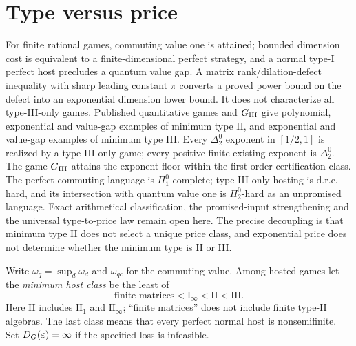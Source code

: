 \section{Type versus price}\label{sec:phase}
For finite rational games, commuting value one is attained; bounded dimension cost is equivalent to a finite-dimensional perfect strategy, and a normal type-I perfect host precludes a quantum value gap. A matrix rank/dilation-defect inequality with sharp leading constant $\pi$ converts a proved power bound on the defect into an exponential dimension lower bound. It does not characterize all type-III-only games. Published quantitative games and $G_{\mathrm{III}}$ give polynomial, exponential and value-gap examples of minimum type II, and exponential and value-gap examples of minimum type III. Every $\Delta^0_2$ exponent in $[1/2,1]$ is realized by a type-III-only game; every positive finite existing exponent is $\Delta^0_2$. The game $G_{\mathrm{III}}$ attains the exponent floor within the first-order certification class. The perfect-commuting language is $\Pi^0_1$-complete; type-III-only hosting is d.r.e.-hard, and its intersection with quantum value one is $\Pi^0_2$-hard as an unpromised language. Exact arithmetical classification, the promised-input strengthening and the universal type-to-price law remain open here. The precise decoupling is that minimum type II does not select a unique price class, and exponential price does not determine whether the minimum type is II or III.

Write $\omega_q=\sup_d\omega_d$ and $\omega_{qc}$ for the commuting value. Among hosted games let the \emph{minimum host class} be the least of
\[
 \text{finite matrices}<\mathrm I_\infty<\mathrm{II}<\mathrm{III}.
\]
Here II includes $\mathrm{II}_1$ and $\mathrm{II}_\infty$; ``finite matrices'' does not include finite type-II algebras. The last class means that every perfect normal host is nonsemifinite. Set $D_G(\varepsilon)=\infty$ if the specified loss is infeasible.

